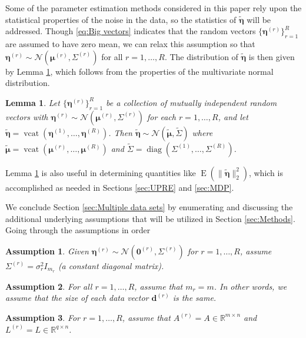 \documentclass[12pt]{article}
\newcommand{\mA}{m}	%
\newcommand{\mL}{q}	%
\newcommand{\dVec}{\mathbf{d}}	%
\DeclareMathOperator{\diag}{diag}	%
\DeclareMathOperator{\vcat}{vcat}	%
\newcommand{\noise}{\eta}	%
\newcommand{\noiseSD}{\sigma}	%
\newcommand{\noiseVec}{\bm{\noise}}	%
\DeclareMathOperator{\E}{E}	%
\newcommand{\zeroVec}{\bm{0}}	%
\newtheorem{assumption}{Assumption}
\newtheorem{lemma}{Lemma}[section]
\begin{document}
Some of the parameter estimation methods considered in this paper rely upon the statistical properties of the noise in the data, so the statistics of $\widetilde{\noiseVec}$ will be addressed. Though \eqref{eq:Big vectors} indicates that the random vectors $\{\noiseVec^{(r)}\}_{r=1}^R$ are assumed to have zero mean, we can relax this assumption so that $\noiseVec^{(r)} \sim \mathcal{N}(\bm{\mu}^{(r)},\Sigma^{(r)})$ for all $r = 1,\ldots,R$. The distribution of $\widetilde{\noiseVec}$ is then given by Lemma \ref{lem:Concatenation of Normal Noise}, which follows from the properties of the multivariate normal distribution. 
\begin{lemma}
\label{lem:Concatenation of Normal Noise}
Let $\{\noiseVec^{(r)}\}_{r=1}^R$ be a collection of mutually independent random vectors with $\noiseVec^{(r)} \sim \mathcal{N}(\bm{\mu}^{(r)},\Sigma^{(r)})$ for each $r = 1,\ldots,R$, and let $\widetilde{\noiseVec} = \vcat(\noiseVec^{(1)},\ldots,\noiseVec^{(R)})$. Then $\widetilde{\noiseVec} \sim \mathcal{N}(\widetilde{\bm{\mu}},\widetilde{\Sigma})$ where $\widetilde{\bm{\mu}} = \vcat(\bm{\mu}^{(r)},\ldots,\bm{\mu}^{(R)})$ and $\widetilde{\Sigma} = \diag(\Sigma^{(1)},\ldots,\Sigma^{(R)})$.
\end{lemma}
\noindent Lemma \ref{lem:Concatenation of Normal Noise} is also useful in determining quantities like $\E(\|\widetilde{\noiseVec}\|_2^2)$, which is accomplished as needed in Sections \ref{sec:UPRE} and \ref{sec:MDP}. \par
We conclude Section \ref{sec:Multiple data sets} by enumerating and discussing the additional underlying assumptions that will be utilized in Section \ref{sec:Methods}. Going through the assumptions in order

\begin{assumption}
\label{Assumption_Noise}
Given $\noiseVec^{(r)} \sim \mathcal{N}(\zeroVec^{(r)},\Sigma^{(r)})$ for $r = 1,\ldots,R$, assume $\Sigma^{(r)} = \noiseSD_r^2 I_{m_r}$ (a constant diagonal matrix).
\end{assumption}

\begin{assumption}
\label{Assumption_Rows}
For all $r = 1,\ldots,R$, assume that $m_r = m$. In other words, we assume that the size of each data vector $\dVec^{(r)}$ is the same.
\end{assumption} 

\begin{assumption}
\label{Assumption_Matrices}
For $r = 1,\ldots,R$, assume that $A^{(r)} = A \in \mathbb{R}^{\mA \times n}$ and $L^{(r)} = L \in \mathbb{R}^{\mL \times n}$.
\end{assumption}  
\end{document}
